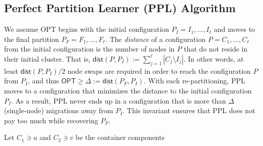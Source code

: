 \documentclass[manuscript,screen=true]{acmart}
\newcommand{\OPT}{\textsf{OPT}\xspace}
\newcommand{\PPL}{\textsf{PPL}\xspace}
\newcommand{\dist}{\textsf{dist}}
\DeclarePairedDelimiter\set{\{}{\}}
\begin{document}
\subsection{Perfect Partition Learner (\PPL) Algorithm}
     
We assume \OPT begins with the initial configuration
$P_I = I_1, \dots, I_{\ell}$ and moves to the final partition
$P_F = F_1, \dots, F_{\ell}$.
 The \emph{distance} of a configuration $P = C_1, \dots, C_{\ell}$ from the initial configuration is the number of nodes in $P$ that do not reside in their initial cluster.
    That is,
    $\dist(P, P_I) := \sum_{j=1}^{\ell} | C_j \setminus I_j |$. 
In other words,
at least $\dist(P, P_I)/2$ node swaps are required in order to reach the configuration $P$ from $P_I$, and thus
$\OPT \geq \Delta:= \dist(P_F, P_I) $.
 With each re-partitioning,
  \PPL moves to a configuration that minimizes the distance to the initial configuration $P_I$.
As a result,
\PPL never ends up in a configuration that is more than $\Delta$ (single-node) migrations away from $P_I$.
This invariant ensures that \PPL does not pay too much while recovering $P_F$.

\begin{algorithm}
    \renewcommand{\algorithmicrequire}{\textbf{Input:}}
    \renewcommand{\algorithmicensure}{\textbf{Output:}}
    \begin{algorithmic}
         \label{line:initcomponents}
        \STATE Let $C_1 \ni u$ and $C_2 \ni v$ be the container components
         \label{line:mergecomponents}
        \label{line:rebalance} 
        \ENDIF
        \ENDIF
        \ENDFOR
    \end{algorithmic}
    \caption{Perfect Partition Learner (\PPL)}
    \label{alg:ppl}
      \end{algorithm}
  
\end{document}
